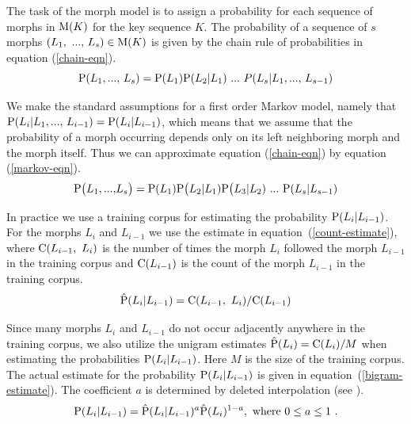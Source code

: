 \documentclass{llncs}
\begin{document}
The task of the morph model is to assign a probability for each
sequence of morphs in ${\rm M}(K)$ for the key sequence $K$. The
probability of a sequence of $s$ morphs $(L_1{\rm,\ ...,\ }L_s) \in {\rm M}(K)$
is given by the chain rule of probabilities in equation
(\ref{chain-eqn}).
\begin{equation}\label{chain-eqn}
{\rm P}(L_1{\rm, ..., }\ L_s) = {\rm P}(L_1){\rm P}(L_2|L_1)\ {\rm
  ... }\ P(L_s| L_1{\rm, ..., }\ L_{s - 1})
\end{equation}

We make the standard assumptions for a first order Markov model,
namely that ${\rm P}(L_i | L_1{\rm, ..., }\ L_{i-1}) = {\rm P}(L_i |
L_{i-1})$, which means that we assume that the probability of a morph
occurring depends only on its left neighboring morph and the morph
itself. Thus we can approximate equation (\ref{chain-eqn}) by
equation (\ref{markov-eqn}).
\begin{equation}\label{markov-eqn}
{\rm P}\big(L_1{\rm, ..., }L_s\big) = {\rm P}(L_1){\rm P}\big(L_2 |
L_1){\rm P}\big(L_3 | L_2)\ {\rm ... }\ {\rm P}(L_{s} | L_{s-1})
\end{equation}

In practice we use a training corpus for estimating the probability
${\rm P}(L_i | L_{i-1})$. For the morphs $L_i$ and $L_{i-1}$ we
use the estimate in equation~(\ref{count-estimate}), where ${\rm
  C}(L_{i-1},\ L_i)$ is the number of times the morph $L_{i}$
followed the morph $L_{i-1}$ in the training corpus and ${\rm
  C}(L_{i-1})$ is the count of the morph $L_{i-1}$ in the training
corpus.
\begin{equation}\label{count-estimate}
{\rm \hat{P}}(L_i | L_{i-1}) = {\rm C}(L_{i - 1},\ L_i) / {\rm
  C}(L_{i-1})
\end{equation}

Since many morphs $L_i$ and $L_{i-1}$ do not occur adjacently anywhere
in the training corpus, we also utilize the unigram estimates ${\rm
  \hat{P}}(L_i) = {\rm C}(L_i)/M$ when estimating the probabilities
${\rm P}(L_i | L_{i-1})$. Here $M$ is the size of the training
corpus. The actual estimate for the probability ${\rm P}(L_i |
L_{i-1})$ is given in equation~(\ref{bigram-estimate}). The
coefficient $a$ is determined by deleted interpolation (see
\cite{Brants:2000}).
\begin{equation}\label{bigram-estimate}
{\rm P}(L_i | L_{i-1}) = {\rm \hat{P}}(L_i | L_{i-1})^a{\rm
  \hat{P}}(L_i)^{1 - a}{\rm,\ where }\ 0\leq a \leq 1\ {\rm.}
\end{equation}
\end{document}
